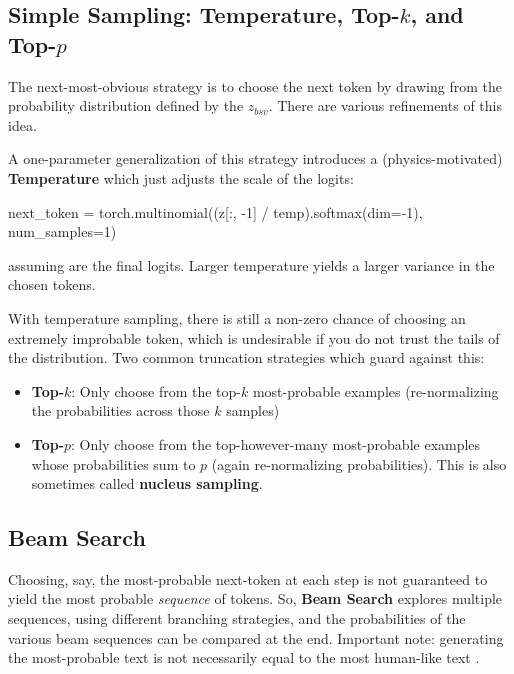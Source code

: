 \documentclass[11pt]{article}
\begin{document}
\subsection{Simple Sampling: Temperature, Top-$ k $, and Top-$ p $ \label{subsec_simple_sampling}}

The next-most-obvious strategy is to choose the next token by drawing from the probability
distribution defined by the $ z _{ bsv } $. There are various refinements of this idea.

A one-parameter generalization of this strategy
introduces a (physics-motivated) \textbf{Temperature} which just adjusts the scale of the logits:
\begin{py}
next_token = torch.multinomial((z[:, -1] / temp).softmax(dim=-1), num_samples=1)
\end{py}
assuming  are the final logits. Larger temperature yields a larger variance in the chosen
tokens.

With temperature sampling, there is still a non-zero chance of choosing an extremely improbable token,
which is undesirable if you do not trust the tails of the distribution. Two common truncation
strategies which guard against this:
\begin{itemize}
    \item \textbf{Top-}$ k $: Only choose from the top-$ k $ most-probable examples (re-normalizing
        the probabilities across those $ k $ samples)
    \item \textbf{Top-}$  p$: Only choose from the top-however-many most-probable examples whose
    probabilities sum to $ p $ (again re-normalizing probabilities). This is also sometimes called
    \textbf{nucleus sampling}.
\end{itemize}


\subsection{Beam Search \label{subsec_beam_search}}

Choosing, say, the most-probable next-token at each step is not guaranteed to yield the most
probable \textit{sequence} of tokens. So, \textbf{Beam Search} explores multiple sequences, using
different branching strategies, and the probabilities of the various beam sequences can be compared
at the end. Important note: generating the most-probable text is not necessarily equal to the most
human-like text \cite{holtzman2020curious}.
\end{document}
